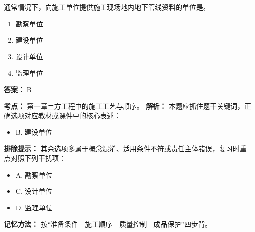 \documentclass[UTF8,fontset=fandol,11pt]{ctexart}
\begin{document}
\vspace{0.2em}

\begin{quizbox}[title={第 23 题}]
通常情况下，向施工单位提供施工现场地内地下管线资料的单位是。\\
\begin{enumerate}[label=\Alph*.]
\item 勘察单位
\item 建设单位
\item 设计单位
\item 监理单位
\end{enumerate}
\textbf{答案：} B
\vspace{0.25em}
\begin{answerbox}[title={考点解析}]
\textbf{考点：} 第一章土方工程中的施工工艺与顺序。
\textbf{解析：} 本题应抓住题干关键词，正确选项对应教材或课件中的核心表述：
\begin{itemize}
\item B. 建设单位
\end{itemize}
\textbf{排除提示：} 其余选项多属于概念混淆、适用条件不符或责任主体错误，复习时重点对照下列干扰项：
\begin{itemize}
\item A. 勘察单位
\item C. 设计单位
\item D. 监理单位
\end{itemize}
\textbf{记忆方法：} 按“准备条件—施工顺序—质量控制—成品保护”四步背。
\end{answerbox}
\end{quizbox}

\vspace{0.2em}
\end{document}
